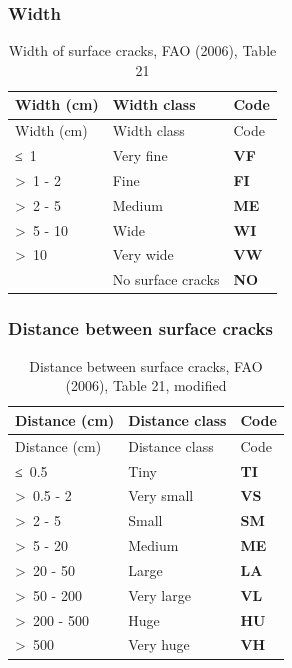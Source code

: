 \documentclass[
  letterpaper,
  DIV=11,
  numbers=noendperiod]{scrreprt}
\begin{document}
\hypertarget{width}{%
\subsubsection{Width}\label{width}}

\begin{longtable}[]{@{}lll@{}}
\caption{Width of surface cracks, FAO (2006), Table 21}\tabularnewline
\toprule()
Width (cm) & Width class & Code \\
\midrule()
\endfirsthead
\toprule()
Width (cm) & Width class & Code \\
\midrule()
\endhead
≤~1 & Very fine & \textbf{VF} \\
\textgreater~1 - 2 & Fine & \textbf{FI} \\
\textgreater~2 - 5 & Medium & \textbf{ME} \\
\textgreater~5 - 10 & Wide & \textbf{WI} \\
\textgreater~10 & Very wide & \textbf{VW} \\
& No surface cracks & \textbf{NO} \\
\bottomrule()
\end{longtable}

\hypertarget{distance-between-surface-cracks}{%
\subsubsection{Distance between surface
cracks}\label{distance-between-surface-cracks}}

\begin{longtable}[]{@{}lll@{}}
\caption{Distance between surface cracks, FAO (2006), Table 21,
modified}\tabularnewline
\toprule()
Distance (cm) & Distance class & Code \\
\midrule()
\endfirsthead
\toprule()
Distance (cm) & Distance class & Code \\
\midrule()
\endhead
≤~0.5 & Tiny & \textbf{TI} \\
\textgreater~0.5 - 2 & Very small & \textbf{VS} \\
\textgreater~2 - 5 & Small & \textbf{SM} \\
\textgreater~5 - 20 & Medium & \textbf{ME} \\
\textgreater~20 - 50 & Large & \textbf{LA} \\
\textgreater~50 - 200 & Very large & \textbf{VL} \\
\textgreater~200 - 500 & Huge & \textbf{HU} \\
\textgreater~500 & Very huge & \textbf{VH} \\
\bottomrule()
\end{longtable}
\end{document}
